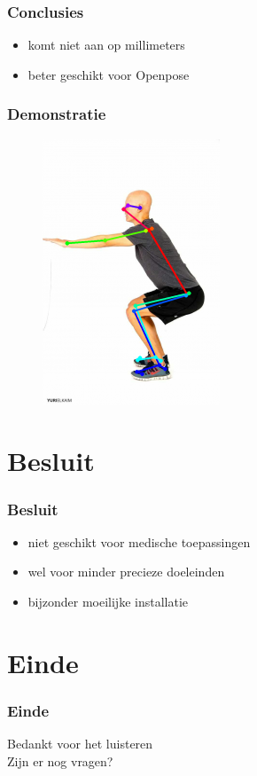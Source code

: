 \documentclass
   [kulak] %
   {kulakbeamer}
\begin{document}
\begin{frame}
	\frametitle{Conclusies}
	\begin{itemize}
		\item komt niet aan op millimeters
		\item beter geschikt voor Openpose
	\end{itemize}
\end{frame}

\begin{frame}
	\frametitle{Demonstratie}
	\begin{figure}
		\includegraphics[width= .4\textwidth]{squat_HPE}
	\end{figure}
\end{frame}



\section{Besluit}

\begin{frame}
\frametitle{Besluit}
\begin{itemize}
	\item niet geschikt voor medische toepassingen
	\item wel voor minder precieze doeleinden
	\item bijzonder moeilijke installatie
\end{itemize}
\end{frame}

\section*{Einde}
\begin{frame}
\frametitle{Einde}
\begin{center}
	Bedankt voor het luisteren\\
	Zijn er nog vragen?
\end{center}
\end{frame}
\end{document}
